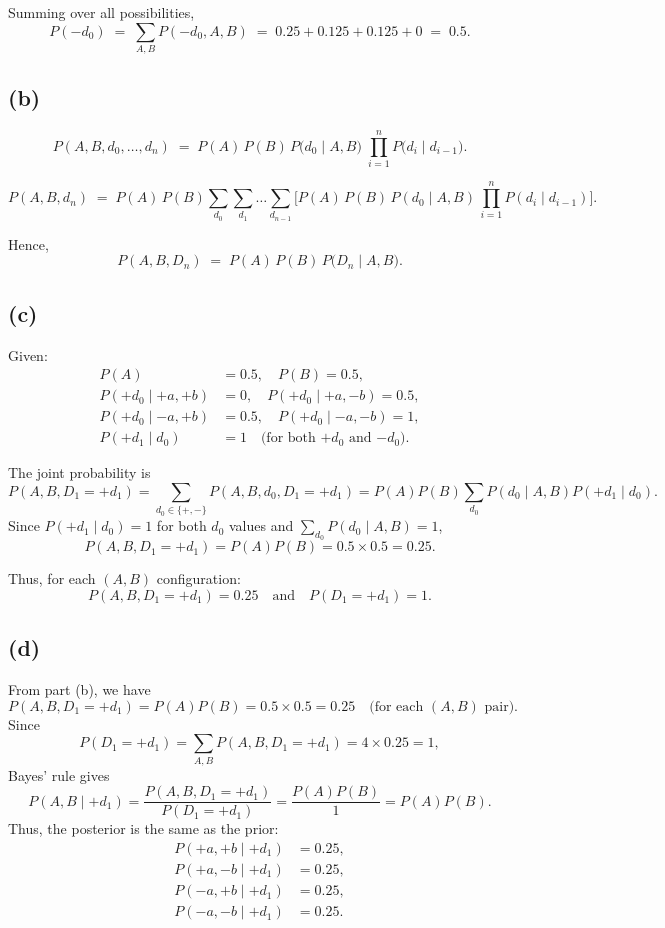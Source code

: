 \documentclass[11pt]{article}
\begin{document}
Summing over all possibilities,
\[
  P(-d_0)
  \;=\;
  \sum_{A,B} P(-d_0, A, B)
  \;=\;
  0.25 + 0.125 + 0.125 + 0
  \;=\;
  0.5.
\]

\subsection*{(b)}

\[
  P(A,B,d_{0},\dots,d_{n})
  \;=\;
  P(A)\,P(B)\,P\bigl(d_{0}\mid A,B\bigr)
  \;\prod_{i=1}^{n}P\bigl(d_{i}\mid d_{i-1}\bigr).
\]

\[
  P(A,B,d_{n})
  \;=\;
  P(A)\,P(B)
  \sum_{d_{0}} \sum_{d_{1}} \dots \sum_{d_{n-1}}
  \bigl[
    P(A)\,P(B)\,P(d_{0}\mid A,B)
    \,\prod_{i=1}^{n} P(d_{i}\mid d_{i-1})
  \bigr].
\]

Hence,
\[
  P(A,B,D_{n})
  \;=\;
  P(A)\,P(B)\,P\bigl(D_{n}\mid A,B\bigr).
\]

\subsection*{(c)}
Given:
\[
\begin{aligned}
P(A) &= 0.5,\quad P(B)=0.5,\\[1mm]
P(+d_0\mid +a,+b)&=0,\quad P(+d_0\mid +a,-b)=0.5,\\[1mm]
P(+d_0\mid -a,+b)&=0.5,\quad P(+d_0\mid -a,-b)=1,\\[1mm]
P(+d_1\mid d_0)&=1\quad\text{(for both \(+d_0\) and \(-d_0\)).}
\end{aligned}
\]

The joint probability is
\[
P(A,B,D_1=+d_1)=\sum_{d_0\in\{+,-\}} P(A,B,d_0,D_1=+d_1)
= P(A)P(B)\sum_{d_0} P(d_0\mid A,B)P(+d_1\mid d_0).
\]
Since \(P(+d_1\mid d_0)=1\) for both \(d_0\) values and \(\sum_{d_0} P(d_0\mid A,B)=1\),
\[
P(A,B,D_1=+d_1)=P(A)P(B)=0.5\times0.5=0.25.
\]

Thus, for each \((A,B)\) configuration:
\[
P(A,B,D_1=+d_1)=0.25 \quad\text{and}\quad P(D_1=+d_1)=1.
\]


\subsection*{(d)}
From part (b), we have
\[
P(A,B,D_1=+d_1)=P(A)P(B)=0.5\times0.5=0.25 \quad\text{(for each \((A,B)\) pair)}.
\]
Since
\[
P(D_1=+d_1)=\sum_{A,B}P(A,B,D_1=+d_1)=4\times0.25=1,
\]
Bayes' rule gives
\[
P(A,B\mid +d_1)=\frac{P(A,B,D_1=+d_1)}{P(D_1=+d_1)}
=\frac{P(A)P(B)}{1}=P(A)P(B).
\]
Thus, the posterior is the same as the prior:
\[
\begin{aligned}
P(+a,+b\mid +d_1)&=0.25,\\[1mm]
P(+a,-b\mid +d_1)&=0.25,\\[1mm]
P(-a,+b\mid +d_1)&=0.25,\\[1mm]
P(-a,-b\mid +d_1)&=0.25.
\end{aligned}
\]
\end{document}
